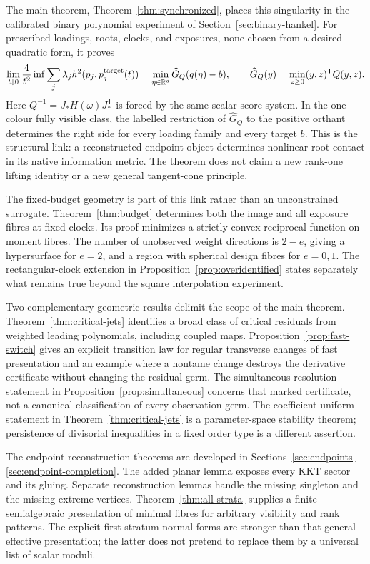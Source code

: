 \documentclass[11pt,reqno]{amsart}
\numberwithin{equation}{section}
\theoremstyle{definition}
\theoremstyle{remark}
\newcommand{\R}{\mathbb R}
\begin{document}
The main theorem, Theorem~\ref{thm:synchronized}, places this singularity in the calibrated binary polynomial experiment of Section~\ref{sec:binary-hankel}. For prescribed loadings, roots, clocks, and exposures, none chosen from a desired quadratic form, it proves
\begin{equation}\label{eq:main-contact}
 \lim_{t\downarrow0}\frac4{t^2}\inf\sum_j\lambda_j h^2(p_j,p_j^{\rm target}(t))
 =\min_{\eta\in\R^d}\widehat G_Q(q(\eta)-b),
 \qquad \widehat G_Q(y)=\min_{z\ge0}(y,z)^{\mathsf T}Q(y,z).
\end{equation}
Here $Q^{-1}=J_*H(\omega)J_*^{\mathsf T}$ is forced by the same scalar score system. In the one-colour fully visible class, the labelled restriction of $\widehat G_Q$ to the positive orthant determines the right side for every loading family and every target $b$. This is the structural link: a reconstructed endpoint object determines nonlinear root contact in its native information metric. The theorem does not claim a new rank-one lifting identity or a new general tangent-cone principle.

The fixed-budget geometry is part of this link rather than an unconstrained surrogate. Theorem~\ref{thm:budget} determines both the image and all exposure fibres at fixed clocks. Its proof minimizes a strictly convex reciprocal function on moment fibres. The number of unobserved weight directions is $2-e$, giving a hypersurface for $e=2$, and a region with spherical design fibres for $e=0,1$. The rectangular-clock extension in Proposition~\ref{prop:overidentified} states separately what remains true beyond the square interpolation experiment.

Two complementary geometric results delimit the scope of the main theorem. Theorem~\ref{thm:critical-jets} identifies a broad class of critical residuals from weighted leading polynomials, including coupled maps. Proposition~\ref{prop:fast-switch} gives an explicit transition law for regular transverse changes of fast presentation and an example where a nontame change destroys the derivative certificate without changing the residual germ. The simultaneous-resolution statement in Proposition~\ref{prop:simultaneous} concerns that marked certificate, not a canonical classification of every observation germ. The coefficient-uniform statement in Theorem~\ref{thm:critical-jets} is a parameter-space stability theorem; persistence of divisorial inequalities in a fixed order type is a different assertion.

The endpoint reconstruction theorems are developed in Sections~\ref{sec:endpoints}--\ref{sec:endpoint-completion}. The added planar lemma exposes every KKT sector and its gluing. Separate reconstruction lemmas handle the missing singleton and the missing extreme vertices. Theorem~\ref{thm:all-strata} supplies a finite semialgebraic presentation of minimal fibres for arbitrary visibility and rank patterns. The explicit first-stratum normal forms are stronger than that general effective presentation; the latter does not pretend to replace them by a universal list of scalar moduli.
\end{document}
